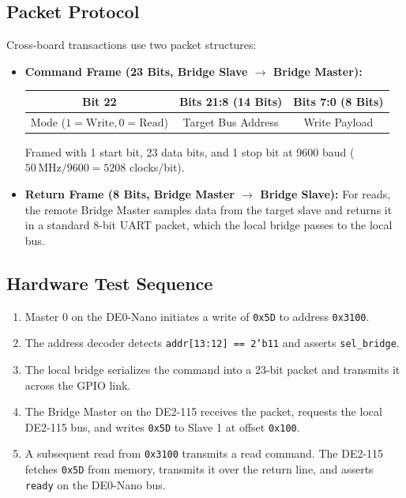 \documentclass[11pt,a4paper]{article}
\begin{document}
\subsection{Packet Protocol}
Cross-board transactions use two packet structures:
\begin{itemize}
    \item \textbf{Command Frame (23 Bits, Bridge Slave $\to$ Bridge Master):}
    \begin{center}
    \begin{tabular}{|c|c|c|}
    \hline
    \textbf{Bit 22} & \textbf{Bits 21:8 (14 Bits)} & \textbf{Bits 7:0 (8 Bits)} \\
    \hline
    Mode ($1 = \text{Write}, 0 = \text{Read}$) & Target Bus Address & Write Payload \\
    \hline
    \end{tabular}
    \end{center}
    Framed with 1 start bit, 23 data bits, and 1 stop bit at 9600 baud ($50\,\text{MHz} / 9600 = 5208$ clocks/bit).
    \item \textbf{Return Frame (8 Bits, Bridge Master $\to$ Bridge Slave):}
    For reads, the remote Bridge Master samples data from the target slave and returns it in a standard 8-bit UART packet, which the local bridge passes to the local bus.
\end{itemize}

\subsection{Hardware Test Sequence}
\begin{enumerate}
    \item Master 0 on the DE0-Nano initiates a write of \texttt{0x5D} to address \texttt{0x3100}.
    \item The address decoder detects \texttt{addr[13:12] == 2'b11} and asserts \texttt{sel\_bridge}.
    \item The local bridge serializes the command into a 23-bit packet and transmits it across the GPIO link.
    \item The Bridge Master on the DE2-115 receives the packet, requests the local DE2-115 bus, and writes \texttt{0x5D} to Slave 1 at offset \texttt{0x100}.
    \item A subsequent read from \texttt{0x3100} transmits a read command. The DE2-115 fetches \texttt{0x5D} from memory, transmits it over the return line, and asserts \texttt{ready} on the DE0-Nano bus.
\end{enumerate}
\end{document}
